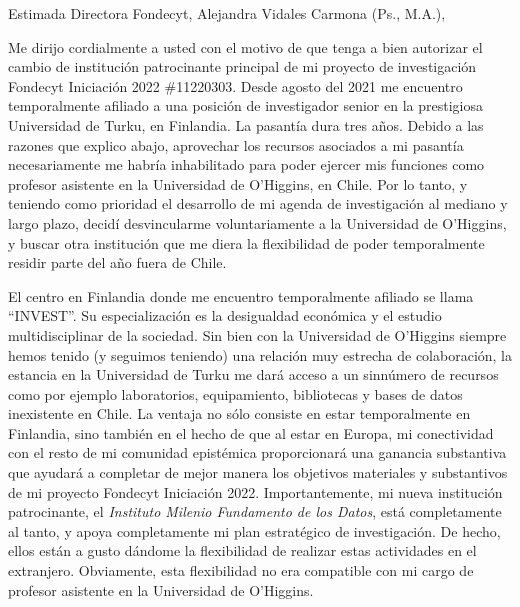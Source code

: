 \documentclass[9pt,stdletter,dateno,sigleft,openany]{newlfm} %
\begin{document}
\begin{newlfm}




\vspace{-2cm}
Estimada Directora Fondecyt, Alejandra Vidales Carmona (Ps., M.A.),

Me dirijo cordialmente a usted con el motivo de que tenga a bien autorizar el cambio de instituci\'on patrocinante principal de mi proyecto de investigaci\'on Fondecyt Iniciaci\'on 2022 \#11220303. Desde agosto del 2021 me encuentro temporalmente afiliado a una posici\'on de investigador senior en la prestigiosa Universidad de Turku, en Finlandia. La pasant\'ia dura tres a\~nos. Debido a las razones que explico abajo, aprovechar los recursos asociados a mi pasant\'ia necesariamente me habr\'ia inhabilitado para poder ejercer mis funciones como profesor asistente en la Universidad de O'Higgins, en Chile. Por lo tanto, y teniendo como prioridad el desarrollo de mi agenda de investigaci\'on al mediano y largo plazo, decid\'i desvincularme voluntariamente a la Universidad de O'Higgins, y buscar otra instituci\'on que me diera la flexibilidad de poder temporalmente residir parte del a\~no fuera de Chile. 


El centro en Finlandia donde me encuentro temporalmente afiliado se llama ``INVEST''. Su especializaci\'on es la desigualdad econ\'omica y el estudio multidisciplinar de la sociedad. Sin bien con la Universidad de O'Higgins siempre hemos tenido (y seguimos teniendo) una relaci\'on muy estrecha de colaboraci\'on, la estancia en la Universidad de Turku me dar\'a acceso a un sinn\'umero de recursos como por ejemplo laboratorios, equipamiento, bibliotecas y bases de datos inexistente en Chile. La ventaja no s\'olo consiste en estar temporalmente en Finlandia, sino tambi\'en en el hecho de que al estar en Europa, mi conectividad con el resto de mi comunidad epist\'emica proporcionar\'a una ganancia substantiva que ayudar\'a a completar de mejor manera los objetivos materiales y substantivos de mi proyecto Fondecyt Iniciaci\'on 2022. Importantemente, mi nueva instituci\'on patrocinante, el \emph{Instituto Milenio Fundamento de los Datos}, est\'a completamente al tanto, y apoya completamente mi plan estrat\'egico de investigaci\'on. De hecho, ellos est\'an a gusto d\'andome la flexibilidad de realizar estas actividades en el extranjero. Obviamente, esta flexibilidad no era compatible con mi cargo de profesor asistente en la Universidad de O'Higgins. 



\end{newlfm}
\end{document}
